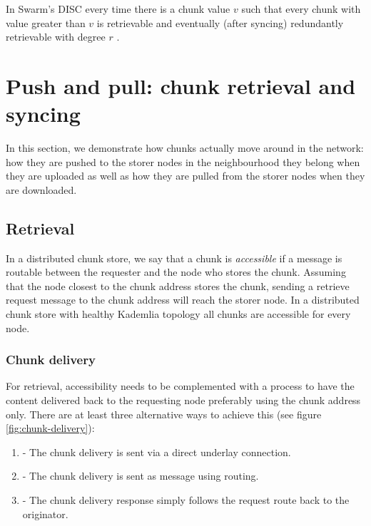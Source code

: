 In Swarm's DISC every time there is a chunk value $v$ such that every chunk with value greater than $v$ is retrievable and eventually (after syncing) redundantly retrievable with degree $r$ .


\section{Push and pull: chunk retrieval and syncing}\label{sec:push-and-pull}

In this section,  we demonstrate how chunks actually move around in the network: how they are pushed to the storer nodes in the neighbourhood they belong when they are uploaded as well as how they are pulled from the storer nodes when they are downloaded.

\subsection{Retrieval}\label{sec:retrieval}

In a distributed chunk store, we say that a chunk is \emph{accessible} if a message is routable between the requester and the node who stores the chunk. Assuming that the node closest to the chunk address stores the chunk, sending a retrieve request message to the chunk address will reach the storer node. In a distributed chunk store with healthy Kademlia topology all chunks are accessible for every node.

\subsubsection{Chunk delivery}

For retrieval, accessibility needs to be complemented with a process to have the content delivered back to the requesting node preferably using the chunk address only. There are at least three alternative ways to achieve this (see figure \ref{fig:chunk-delivery}):

\begin{enumerate}
    \item {} - The chunk delivery is sent via a direct underlay connection. 
    \item {} - The chunk delivery is sent as message using routing.
    \item {} - The chunk delivery response simply follows the request route back to the originator.
\end{enumerate}


